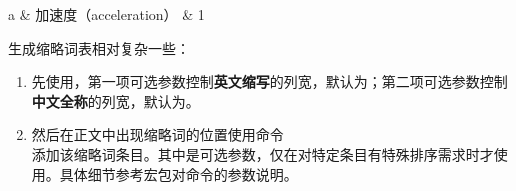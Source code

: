 
	
	\begin{symbtable}
		a & 加速度（acceleration） & 1 \\
	\end{symbtable}
	
	
	\printnomenclature
	
	生成缩略词表相对复杂一些：
	\begin{enumerate}
		\item 先使用，第一项可选参数控制\textbf{英文缩写}的列宽，默认为\shad{5em}；第二项可选参数控制\textbf{中文全称}的列宽，默认为\shad{7.5em}。
		
		\item 然后在正文中出现缩略词的位置使用命令\\添加该缩略词条目。其中是可选参数，仅在对特定条目有特殊排序需求时才使用。具体细节参考\href{https://mirrors.hust.edu.cn/CTAN/macros/latex/contrib/nomencl/nomencl.pdf}{\ttfamily\color{DarkRed}}宏包对命令的参数说明。
	\end{enumerate}
	
